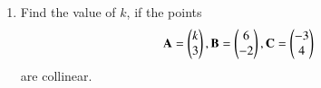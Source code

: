 \renewcommand{\theequation}{\theenumi}
\begin{enumerate}[label=\thesection.\arabic*.,ref=\thesection.\theenumi]

\item Find the value of $k$, if the points
\begin{align}
\mathbf {A}=\begin{pmatrix}k\\3\end{pmatrix},
\mathbf {B}=\begin{pmatrix}6\\-2\end{pmatrix},
\mathbf {C}=\begin{pmatrix}-3\\4\end{pmatrix}
\end{align}
are collinear.
\\
\solution


\end{enumerate}
